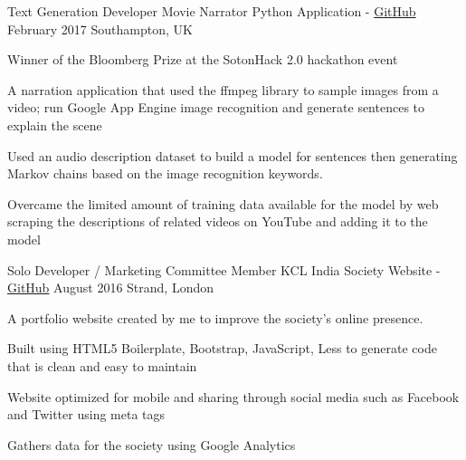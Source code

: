 

\begin{cventries}


    
  \cventry
    {Text Generation Developer} %
    {Movie Narrator Python Application - \href{https://github.com/Vikash-Kothary/hackathon-project-movie-narrator}{GitHub}} %
    {February 2017} %
    {Southampton, UK} %
    {
      \begin{cvitems} %
        \item {Winner of the Bloomberg Prize at the SotonHack 2.0 hackathon event}
        \item {A narration application that used the ffmpeg library to sample images from a video; run Google App Engine image recognition and generate sentences to explain the scene}
        \item {Used an audio description dataset to build a model for sentences then generating Markov chains based on the image recognition keywords.}
        \item {Overcame the limited amount of training data available for the model by web scraping the descriptions of related videos on YouTube and adding it to the model}
      \end{cvitems}
    }
    
  \cventry
    {Solo Developer / Marketing Committee Member} %
    {KCL India Society Website - \href{https://github.com/kclindiasociety/kclindiasociety.github.io}{GitHub}} %
    {August 2016} %
    {Strand, London} %
    {
      \begin{cvitems} %
        \item {A portfolio website created by me to improve the society's online presence.}
        \item {Built using HTML5 Boilerplate, Bootstrap, JavaScript, Less to generate code that is clean and easy to maintain}
        \item {Website optimized for mobile and sharing through social media such as Facebook and Twitter using meta tags}
        \item {Gathers data for the society using Google Analytics}
      \end{cvitems}
    }


\end{cventries}

